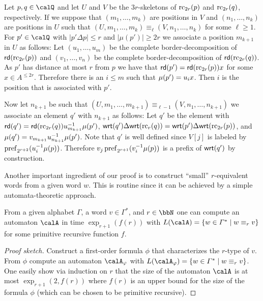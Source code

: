 \begin{definition}
	Let $p,q\in \Qx$ and let $U$ and $V$ be the $3r$-skeletons of $\operatorname{rc}_{2r}(p)$ and $\operatorname{rc}_{2r}(q)$, respectively. If we suppose that $(m_1,\ldots,m_k)$ are positions in $V$ and $(n_1,\ldots,n_k)$ are positions in $U$ such that $(U,m_1,\ldots,m_k) \equiv_{\ell} (V,n_1,\ldots,n_k)$ for some $\ell \geq 1$. For $p'\in \Qx$ with $|p'\Delta p| \leq r$ and $|\mu(p')| \geq 2r$ we associate a position $m_{k+1}$ in $U$ as follows:
	Let $(u_1,\ldots, u_m)$ be the complete border-decomposition of $\mathsf{rd}(\operatorname{rc}_{2r}(p))$ and $(v_1,\ldots,v_n)$ be the complete border-decomposition of $\mathsf{rd}(\operatorname{rc}_{2r}(q))$. As $p'$ has distance at most $r$ from $p$ we have that $\mathsf{rd}(p') = \mathsf{rd}(\operatorname{rc}_{2r}(p))x$
	for some $x\in A^{\leq 2r}$. Therefore there is an $i\leq m$ such that $\mu(p') = u_ix$. Then $i$ is the position that is associated with $p'$.
	
	Now let $n_{k+1}$ be such that $(U,m_1,\ldots,m_{k+1}) \equiv_{\ell-1} (V,n_1,\ldots,n_{k+1})$ we associate an element $q'$ with $n_{k+1}$ as follows:
	Let $q'$ be the element with $\mathsf{rd}(q') = \mathsf{rd}(\operatorname{rc}_{2r}(q))u_{m_{k+1}}^{-1}\mu(p')$, $\mathsf{wrt}(q')\Delta\mathsf{wrt}(\operatorname{rc}_r({q})) = \mathsf{wrt}(p')\Delta\mathsf{wrt}(\operatorname{rc}_{2r}({p}))$, and 
	$\mu(q') = v_{m_{k+1}}u_{n_{k+1}}^{-1}\mu(p')$. Note that $q'$ is well defined since $V[j]$ is labeled by $\operatorname{pref}_{2^{r+2}}(u_i^{-1}\mu(p))$. Therefore $v_j\operatorname{pref}_{2^{r+1}}(v_i^{-1}\mu(p))$ is a prefix of $\mathsf{wrt}(q')$ by construction.
\end{definition}

Another important ingredient of our proof is to construct ``small'' $r$-equivalent words from a given word $w$. This is routine since it can be achieved by a simple automata-theoretic approach.
\begin{lemma}\label{lem:r-equiv_word_construction}
	From a given alphabet $\Gamma$, a word $v\in\Gamma^\ast$, and $r\in\bbN$ one can compute an automaton $\calA$ in time $\exp_{r+1}(f(r))$ with $L(\calA) = \{w\in \Gamma^\ast\mid w\equiv_r v \}$ for some primitive recursive function $f$.
\end{lemma}
\begin{proof}[Proof sketch]
	Construct a first-order formula $\phi$ that characterizes the $r$-type of $v$. From $\phi$ compute an automaton $\calA_\phi$ with $L(\calA_\phi) = \{ w\in\Gamma^\ast \mid w\equiv_r v \}$. One easily show via induction on $r$ that the size of the automaton $\calA$ is at most
	$\exp_{r+1}(2, f(r))$ where $f(r)$ is an upper bound for the size of the formula $\phi$ (which can be chosen to be primitive recursive).
\end{proof}

